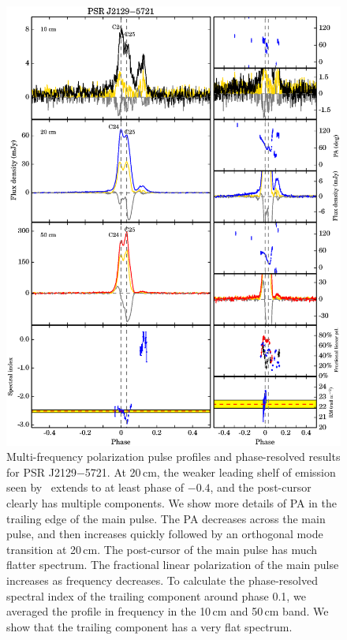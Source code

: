 \documentclass[useAMS,usenatbib]{mn2e}
\begin{document}
\begin{appendix}
\begin{figure}
\begin{center}
\includegraphics[width=6 in]{2129.ps}
\caption{Multi-frequency polarization pulse profiles and phase-resolved results for PSR J2129$-$5721. 
At 20\,cm, the weaker leading shelf of emission seen by~\citet{Yan11} extends to at least 
phase of $-0.4$, and the post-cursor clearly has multiple components.
%
We show more details of PA in the trailing edge of the main pulse.  
%
The PA decreases across the main pulse, and then increases quickly followed 
by an orthogonal mode transition at 20\,cm.
%
The post-cursor of the main pulse has much flatter spectrum.
%
The fractional linear polarization of the main pulse increases as frequency 
decreases.
%
To calculate the phase-resolved spectral index of the trailing component
around phase 0.1, we averaged the profile in frequency in the 10\,cm 
and 50\,cm band.
%
We show that the trailing component has a very flat spectrum.
}
\label{2129}
\end{center}
\end{figure}


\end{appendix}
\end{document}
